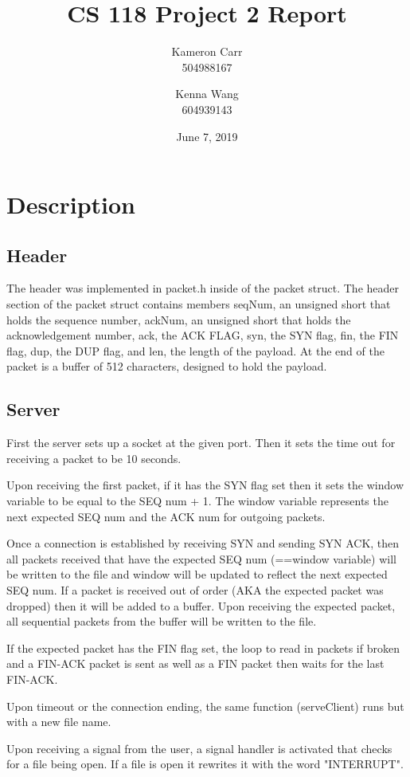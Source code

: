 \documentclass[12pt]{article}
\title{CS 118 Project 2 Report}
\author{Kameron Carr \\ 504988167 \and Kenna Wang \\ 604939143}
\date{June 7, 2019}
\begin{document}
\maketitle

\section{Description}
\subsection{Header}
The header was implemented in packet.h inside of the packet struct. The header section of the packet struct contains members seqNum, an unsigned short that holds the sequence number, ackNum, an unsigned short that holds the acknowledgement number, ack, the ACK FLAG, syn, the SYN flag, fin, the FIN flag, dup, the DUP flag, and len, the length of the payload. At the end of the packet is a buffer of 512 characters, designed to hold the payload.
\subsection{Server}
First the server sets up a socket at the given port. Then it sets the time out for receiving a packet to be 10 seconds.

Upon receiving the first packet, if it has the SYN flag set then it sets the window variable to be equal to the SEQ num + 1. The window variable represents the next expected SEQ num and the ACK num for outgoing packets.

Once a connection is established by receiving SYN and sending SYN ACK, then all packets received that have the expected SEQ num (==window variable) will be written to the file and window will be updated to reflect the next expected SEQ num. If a packet is received out of order (AKA the expected packet was dropped) then it will be added to a buffer. Upon receiving the expected packet, all sequential packets from the buffer will be written to the file.

If the expected packet has the FIN flag set, the loop to read in packets if broken and a FIN-ACK packet is sent as well as a FIN packet then waits for the last FIN-ACK.

Upon timeout or the connection ending, the same function (serveClient) runs but with a new file name.

Upon receiving a signal from the user, a signal handler is activated that checks for a file being open. If a file is open it rewrites it with the word "INTERRUPT".
\end{document}
